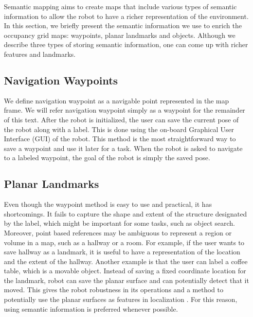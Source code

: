 \documentclass[12pt]{gatech-thesis}
\begin{document}
Semantic mapping aims to create maps that include various types of semantic information to allow the robot to have a richer representation of the environment. In this section, we briefly present the semantic information we use to enrich the occupancy grid maps: waypoints, planar landmarks and objects. Although we describe three types of storing semantic information, one can come up with richer features and landmarks.

\subsection{Navigation Waypoints}
\label{sec:map_waypoints}

We define navigation waypoint as a navigable point represented in the map frame. We will refer navigation waypoint simply as a waypoint for the remainder of this text. After the robot is initialized, the user can save the current pose of the robot along with a label. This is done using the on-board Graphical User Interface (GUI) of the robot. This method is the most straightforward way to save a waypoint and use it later for a task. When the robot is asked to navigate to a labeled waypoint, the goal of the robot is simply the saved pose.



\subsection{Planar Landmarks}
\label{sec:map_landmarks}

Even though the waypoint method is easy to use and practical, it has shortcomings. It fails to capture the shape and extent of the structure designated by the label, which might be important for some tasks, such as object search. Moreover, point based references may be ambiguous to represent a region or volume in a map, such as a hallway or a room. For example, if the user wants to save hallway as a
landmark, it is useful to have a representation of the location
and the extent of the hallway. Another example is that the
user can label a coffee table, which is a movable object.
Instead of saving a fixed coordinate location for the landmark,
robot can save the planar surface and can potentially
detect that it moved. This gives the robot robustness in its operations and a method to potentially use the planar surfaces as features in localization \cite{trevor2012planar}. For this reason, using semantic information is preferred whenever possible.
\end{document}
